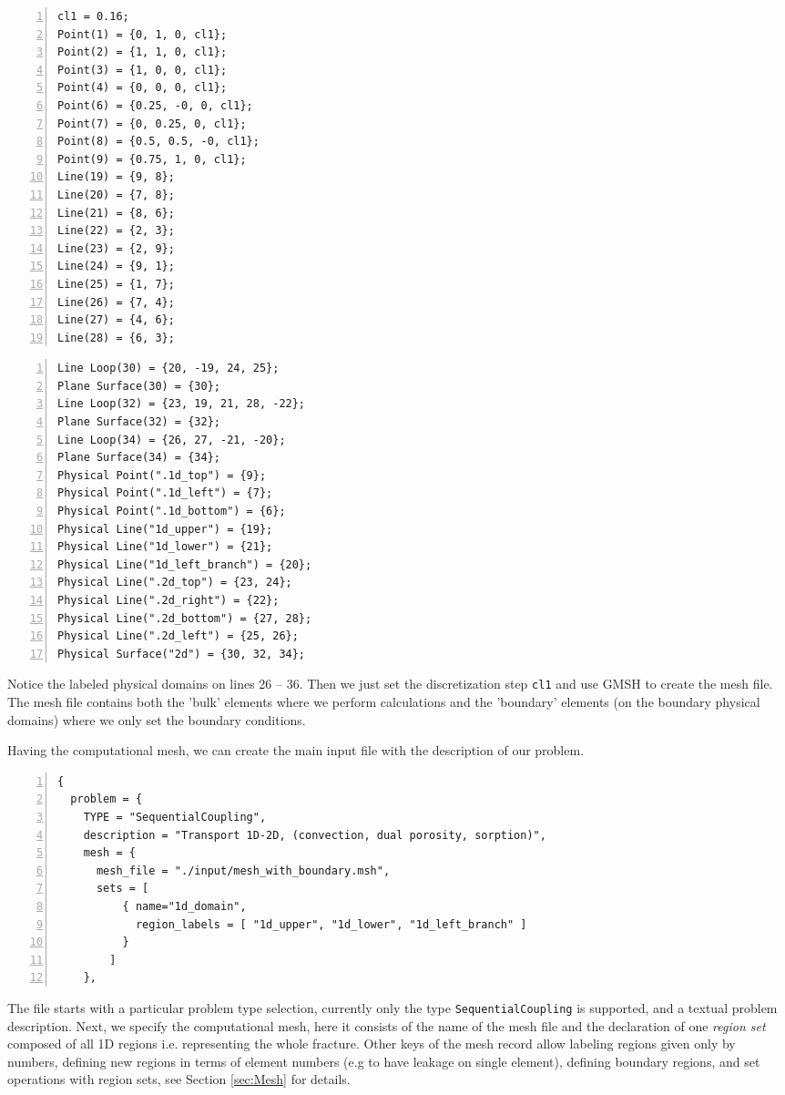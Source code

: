 \documentclass[12pt,a4paper]{report}
\begin{document}
\begin{multicols}{2}
{\small
\begin{Verbatim}[numbers=left]
cl1 = 0.16;
Point(1) = {0, 1, 0, cl1};
Point(2) = {1, 1, 0, cl1};
Point(3) = {1, 0, 0, cl1};
Point(4) = {0, 0, 0, cl1};
Point(6) = {0.25, -0, 0, cl1};
Point(7) = {0, 0.25, 0, cl1};
Point(8) = {0.5, 0.5, -0, cl1};
Point(9) = {0.75, 1, 0, cl1};
Line(19) = {9, 8};
Line(20) = {7, 8};
Line(21) = {8, 6};
Line(22) = {2, 3};
Line(23) = {2, 9};
Line(24) = {9, 1};
Line(25) = {1, 7};
Line(26) = {7, 4};
Line(27) = {4, 6};
Line(28) = {6, 3};
\end{Verbatim}
\columnbreak
\begin{Verbatim}[numbers=left, firstnumber=last]
Line Loop(30) = {20, -19, 24, 25};
Plane Surface(30) = {30};
Line Loop(32) = {23, 19, 21, 28, -22};
Plane Surface(32) = {32};
Line Loop(34) = {26, 27, -21, -20};
Plane Surface(34) = {34};
Physical Point(".1d_top") = {9};
Physical Point(".1d_left") = {7};
Physical Point(".1d_bottom") = {6};
Physical Line("1d_upper") = {19};
Physical Line("1d_lower") = {21};
Physical Line("1d_left_branch") = {20};
Physical Line(".2d_top") = {23, 24};
Physical Line(".2d_right") = {22};
Physical Line(".2d_bottom") = {27, 28};
Physical Line(".2d_left") = {25, 26};
Physical Surface("2d") = {30, 32, 34};
\end{Verbatim}
}
\end{multicols}

Notice the labeled physical domains on lines 26 -- 36. Then we just set the discretization step \verb'cl1' and use GMSH to create the mesh file.
The mesh file contains both the 'bulk' elements where we perform calculations and the 'boundary' elements (on the boundary physical domains) where we only set the boundary conditions.

\pagebreak
Having the computational mesh, we can create the main input file with the description of our problem. 
\begin{Verbatim}[numbers=left]
{
  problem = {
    TYPE = "SequentialCoupling", 
    description = "Transport 1D-2D, (convection, dual porosity, sorption)", 
    mesh = {
      mesh_file = "./input/mesh_with_boundary.msh",
      sets = [
          { name="1d_domain", 
            region_labels = [ "1d_upper", "1d_lower", "1d_left_branch" ]
          }
        ]
    },  
\end{Verbatim}
The file starts with a particular problem type selection, currently only the type \verb'SequentialCoupling' is supported, and a textual problem description.
Next, we specify the computational mesh, here it consists of the name of the mesh file and the declaration of one {\it region set} 
composed of all 1D regions i.e. representing the whole fracture. Other keys of the mesh record allow labeling regions given only by numbers, 
defining new regions in terms of element numbers (e.g to have leakage on single element), 
defining boundary regions, and set operations with region sets, see Section \ref{sec:Mesh} for details.
\end{document}
